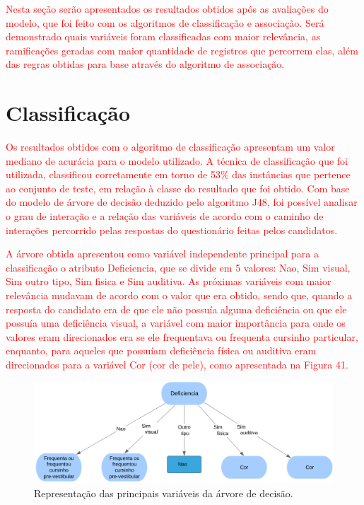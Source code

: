 \label{chapter:Resultados}

\par
\textcolor{red}{Nesta seção serão apresentados os resultados obtidos após as avaliações do modelo, que foi feito com os algoritmos de classificação e associação. Será demonstrado quais variáveis foram classificadas com maior relevância, as ramificações geradas com maior quantidade de registros que percorrem elas, além das regras obtidas para base através do algoritmo de associação.}

\section{Classificação}

\par
\textcolor{red}{Os resultados obtidos com o algoritmo de classificação apresentam um valor mediano de acurácia para o modelo utilizado. A técnica de classificação que foi utilizada, classificou corretamente em torno de 53\% das instâncias que pertence ao conjunto de teste, em relação à classe do resultado que foi obtido. Com base do modelo de árvore de decisão deduzido pelo algoritmo J48, foi possível analisar o grau de interação e a relação das variáveis de acordo com o caminho de interações percorrido pelas respostas do questionário feitas pelos candidatos.}

\par
\textcolor{red}{A árvore obtida apresentou como variável independente principal para a classificação o atributo Deficiencia, que se divide em 5 valores: Nao, Sim visual, Sim outro tipo, Sim fisica e Sim auditiva. As próximas variáveis com maior relevância mudavam de acordo com o valor que era obtido, sendo que, quando a resposta do candidato era de que ele não possuía alguma deficiência ou que ele possuía uma deficiência visual, a variável com maior importância para onde os valores eram direcionados era se ele frequentava ou frequenta cursinho particular, enquanto, para aqueles que possuíam deficiência física ou auditiva eram direcionados para a variável Cor (cor de pele), como apresentada na Figura 41.}

\par
\begin{figure}[!htp]
	\begin{center}
    \caption{\label{fig:waveform_fig} Representação das principais variáveis da árvore de decisão.}
	\includegraphics[scale=0.57]{Figuras/Arvore_gerada_grau2.png}
	\end{center}
\end{figure}


